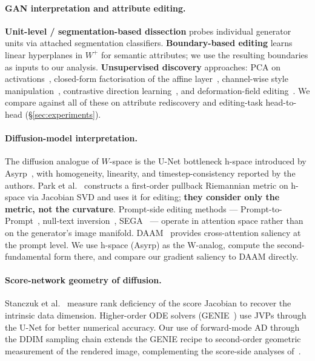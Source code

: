 
\paragraph{GAN interpretation and attribute editing.}
\textbf{Unit-level / segmentation-based dissection}
\cite{Bau2019GANDissection} probes individual generator units via
attached segmentation classifiers. \textbf{Boundary-based editing}
\cite{Shen2020InterFaceGAN, Yang2020HiGAN} learns linear hyperplanes
in $W^+$ for semantic attributes; we use the resulting boundaries as
inputs to our analysis. \textbf{Unsupervised discovery} approaches:
PCA on activations~\cite{Harkonen2020GANSpace}, closed-form
factorisation of the affine layer~\cite{Shen2021SeFa}, channel-wise
style manipulation~\cite{Wu2021StyleSpace}, contrastive direction
learning~\cite{Yuksel2021LatentCLR, Ren2022DisCo}, and
deformation-field editing~\cite{Pan2023DragGAN}. We compare against
all of these on attribute rediscovery and editing-task head-to-head
(§\ref{sec:experiments}).

\paragraph{Diffusion-model interpretation.}
The diffusion analogue of $W$-space is the U-Net bottleneck h-space
introduced by Asyrp~\cite{Kwon2023Asyrp}, with homogeneity, linearity,
and timestep-consistency reported by the authors. Park et
al.~\cite{Park2023Riemannian} constructs a first-order pullback
Riemannian metric on h-space via Jacobian SVD and uses it for
editing; \textbf{they consider only the metric, not the curvature}.
Prompt-side editing methods --- Prompt-to-Prompt~\cite{Hertz2023P2P},
null-text inversion~\cite{Mokady2023NullText},
SEGA~\cite{Brack2023SEGA} --- operate in attention space rather than
on the generator's image manifold. DAAM~\cite{Tang2023DAAM} provides
cross-attention saliency at the prompt level. We use h-space (Asyrp)
as the W-analog, compute the second-fundamental form there, and
compare our gradient saliency to DAAM directly.

\paragraph{Score-network geometry of diffusion.}
Stanczuk et al.~\cite{Stanczuk2024IntrinsicDim} measure rank
deficiency of the score Jacobian to recover the intrinsic data
dimension. Higher-order ODE solvers
(GENIE~\cite{Dockhorn2022GENIE}) use JVPs through the U-Net for
better numerical accuracy. Our use of forward-mode AD through the
DDIM sampling chain extends the GENIE recipe to second-order
geometric measurement of the rendered image, complementing the
score-side analyses of~\cite{Stanczuk2024IntrinsicDim}.

